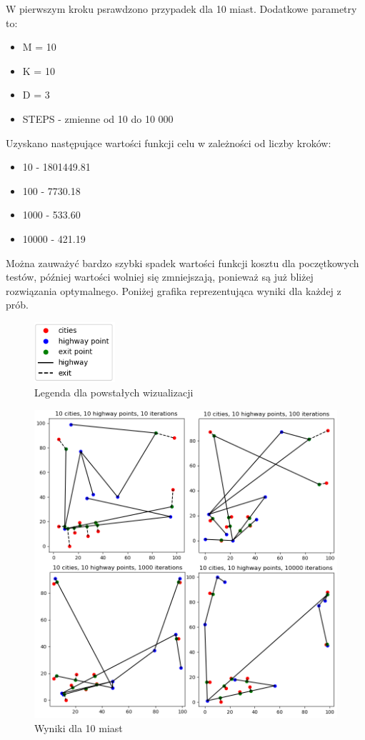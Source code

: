 \documentclass[a4paper]{article}
\begin{document}
W pierwszym kroku psrawdzono przypadek dla 10 miast. Dodatkowe parametry to:
\begin{itemize}
\item M = 10
\item K = 10
\item D = 3
\item STEPS - zmienne od 10 do 10 000
\end{itemize}

Uzyskano następujące wartości funkcji celu w zależności od liczby kroków:
\begin{itemize}
\item 10 - 1801449.81
\item 100 - 7730.18
\item 1000 - 533.60
\item 10000 - 421.19
\end{itemize}

Można zauważyć bardzo szybki spadek wartości funkcji kosztu dla poczętkowych testów, później wartości wolniej się zmniejszają, ponieważ są już bliżej rozwiązania optymalnego.\newline
Poniżej grafika reprezentująca wyniki dla każdej z prób.
\begin{figure}[h!]
\centering
\includegraphics[width=3cm]{legend}
\caption{Legenda dla powstałych wizualizacji}
\end{figure}
\begin{figure}[h!]
\centering
\includegraphics[width=12cm]{10_cities}
\caption{Wyniki dla 10 miast}
\end{figure}
\end{document}
